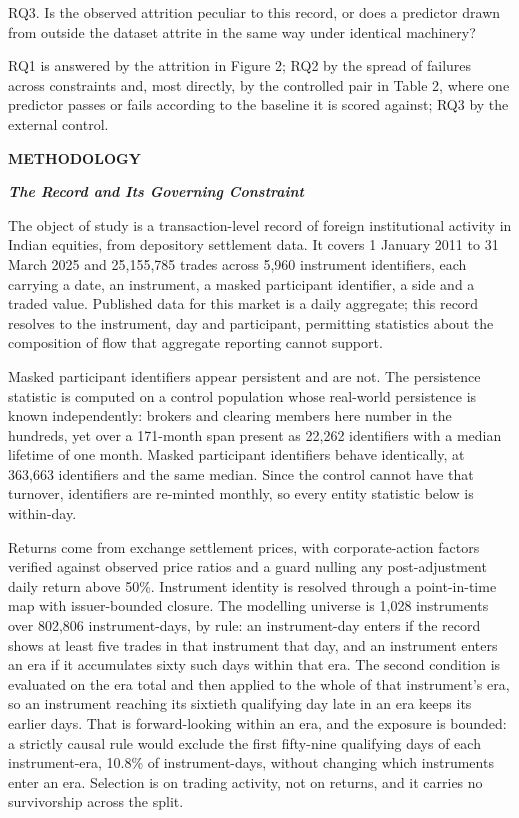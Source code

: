 \documentclass[12pt,a4paper]{article}
\newcommand{\mainhead}[1]{%
  \par\vspace{10pt}\noindent\textbf{\MakeUppercase{#1}}\par\vspace{2pt}}
\newcommand{\subhead}[1]{%
  \par\vspace{6pt}\noindent\textbf{\textit{#1}}\par\vspace{1pt}}
\begin{document}
RQ3. Is the observed attrition peculiar to this record, or does a predictor drawn from outside the dataset attrite in the same way under identical machinery?

RQ1 is answered by the attrition in Figure 2; RQ2 by the spread of failures across constraints and, most directly, by the controlled pair in Table 2, where one predictor passes or fails according to the baseline it is scored against; RQ3 by the external control.

\mainhead{METHODOLOGY}

\subhead{The Record and Its Governing Constraint}

The object of study is a transaction-level record of foreign institutional activity in Indian equities, from depository settlement data. It covers 1 January 2011 to 31 March 2025 and 25,155,785 trades across 5,960 instrument identifiers, each carrying a date, an instrument, a masked participant identifier, a side and a traded value. Published data for this market is a daily aggregate; this record resolves to the instrument, day and participant, permitting statistics about the composition of flow that aggregate reporting cannot support.

Masked participant identifiers appear persistent and are not. The persistence statistic is computed on a control population whose real-world persistence is known independently: brokers and clearing members here number in the hundreds, yet over a 171-month span present as 22,262 identifiers with a median lifetime of one month. Masked participant identifiers behave identically, at 363,663 identifiers and the same median. Since the control cannot have that turnover, identifiers are re-minted monthly, so every entity statistic below is within-day.

Returns come from exchange settlement prices, with corporate-action factors verified against observed price ratios and a guard nulling any post-adjustment daily return above 50\%. Instrument identity is resolved through a point-in-time map with issuer-bounded closure. The modelling universe is 1,028 instruments over 802,806 instrument-days, by rule: an instrument-day enters if the record shows at least five trades in that instrument that day, and an instrument enters an era if it accumulates sixty such days within that era. The second condition is evaluated on the era total and then applied to the whole of that instrument's era, so an instrument reaching its sixtieth qualifying day late in an era keeps its earlier days. That is forward-looking within an era, and the exposure is bounded: a strictly causal rule would exclude the first fifty-nine qualifying days of each instrument-era, 10.8\% of instrument-days, without changing which instruments enter an era. Selection is on trading activity, not on returns, and it carries no survivorship across the split.
\end{document}
